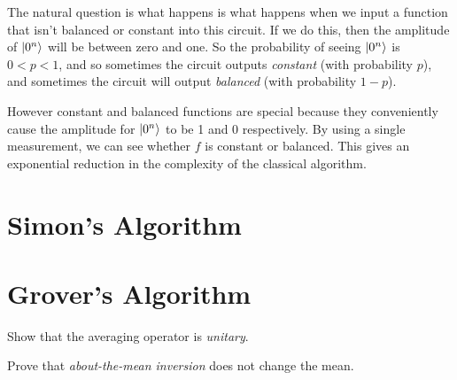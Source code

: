 

The natural question is what happens is what happens when we input a function that 
isn't balanced or constant into this circuit. If we do this, then the 
amplitude of $\left|0^n\right\rangle$ will be between zero and one. So the probability of 
seeing $\left|0^n\right\rangle$ is $0 < p < 1$, and so sometimes the circuit outputs 
\textit{constant} (with probability $p$), and sometimes the circuit will 
output \textit{balanced} (with probability $1-p$).

However constant and balanced functions are special because they
conveniently cause the amplitude for $\left|0^n\right\rangle$ to be 1 and 0 respectively.
By using a single measurement, we can see whether $f$ is
constant or balanced. This gives an exponential reduction in
the complexity of the classical algorithm.

\section{Simon's Algorithm}


\section{Grover's Algorithm}




\begin{example}
Show that the averaging operator is \textit{unitary}.
\end{example}






\begin{example}
Prove that \textit{about-the-mean inversion} does not change the mean.
\end{example}





